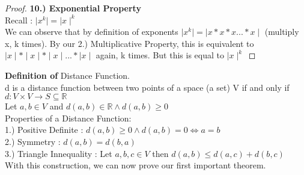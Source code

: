 \documentclass[12pt]{article}
\theoremstyle{definition}
\newenvironment{definition}{\vspace{1em}\noindent\textbf{Definition of}}{\vspace{1em}}
\begin{document}
\begin{proof}
  \textbf{10.) Exponential Property}\\
  Recall : $\mid x^k \mid = \mid x \mid^k$\\
  We can observe that by definition of exponents $\mid x^k \mid = \mid x * x * x ... * x \mid$ (multiply x, k times). By our 2.) Multiplicative Property, this is equivalent to
  $\mid x \mid * \mid x \mid * \mid x \mid ... * \mid x \mid $ again, k times. But this is equal to $\mid x \mid ^k$
\end{proof}
\newpage
\begin{definition}
 Distance Function.\\
 d is a distance function between two points of a space (a set) V if and only if\\
 $d: V \times V \longrightarrow S \subseteq \mathbb{R}$\\
 Let $a,b \in V$ and $d(a,b) \in \mathbb{R} \land d(a,b) \ge 0$\\
 Properties of a Distance Function:\\
 1.) Positive Definite : $d(a,b) \ge 0 \land d(a,b) = 0 \iff a = b$\\
 2.) Symmetry : $d(a,b) = d(b,a)$\\
 3.) Triangle Innequality : Let $a,b,c \in V$ then $ d(a,b) \le d(a,c) + d(b,c) $\\
 With this construction, we can now prove our first important theorem.\\

\end{definition}
\end{document}
